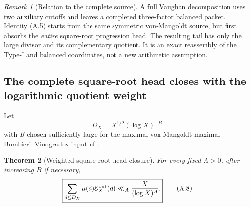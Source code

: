 \documentclass[11pt]{article}
\newtheorem{theorem}{Theorem}[section]
\theoremstyle{definition}
\theoremstyle{remark}
\newtheorem{remark}[theorem]{Remark}
\begin{document}
\begin{remark}[Relation to the complete source]
A full Vaughan decomposition uses two auxiliary cutoffs and leaves a completed
three-factor balanced packet.  Identity \textup{(A.5)} starts from the same
symmetric von-Mangoldt source, but first absorbs the \emph{entire}
square-root progression head.  The resulting tail has only the large divisor
and its complementary quotient.  It is an exact reassembly of the Type-I and
balanced coordinates, not a new arithmetic assumption.
\end{remark}

\subsection{The complete square-root head closes with the logarithmic quotient weight}
\label{subsec:affouter-head}

Let
\begin{equation}
 \label{eq:affouter-DX}
 \boxed{
 D_X=X^{1/2}(\log X)^{-B}}
 \tag{A.7}
\end{equation}
with $B$ chosen sufficiently large for the maximal von-Mangoldt
maximal Bombieri--Vinogradov input of .

\begin{theorem}[Weighted square-root head closure]
\label{thm:affouter-head-closure}
For every fixed $A>0$, after increasing $B$ if necessary,
\begin{equation}
 \label{eq:affouter-head-closure}
 \boxed{
 \sum_{d\le D_X}\mu(d)\mathcal E_X^{\rm out}(d)
 \ll_A\frac{X}{(\log X)^A}.}
 \tag{A.8}
\end{equation}
\end{theorem}
\end{document}
